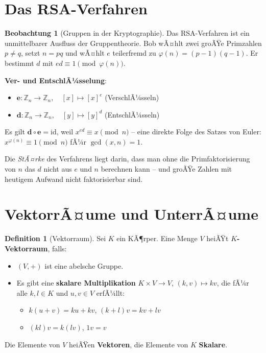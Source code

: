 ﻿\documentclass[a4paper,12pt]{report}
\theoremstyle{definition}
\newtheorem{definition}{Definition}
\newtheorem{beobachtung}{Beobachtung}
\begin{document}
\section{Das RSA-Verfahren}

\begin{beobachtung}[Gruppen in der Kryptographie]
    Das RSA-Verfahren ist ein unmittelbarer Ausfluss der Gruppentheorie.
    Bob wÃ¤hlt zwei groÃŸe Primzahlen $p \neq q$, setzt $n = pq$ und wÃ¤hlt
    $e$ teilerfremd zu $\varphi(n) = (p-1)(q-1)$. Er bestimmt $d$ mit
    $ed \equiv 1 \pmod{\varphi(n)}$.

    \textbf{Ver- und EntschlÃ¼sselung}:
    \begin{itemize}
        \item[-] $\mathbf{e} : \mathbb{Z}_n \to \mathbb{Z}_n, \quad [x] \mapsto [x]^e$ \quad (VerschlÃ¼sseln)
        \item[-] $\mathbf{d} : \mathbb{Z}_n \to \mathbb{Z}_n, \quad [y] \mapsto [y]^d$ \quad (EntschlÃ¼sseln)
    \end{itemize}
    Es gilt $\mathbf{d} \circ \mathbf{e} = \mathrm{id}$, weil $x^{ed} \equiv x \pmod{n}$
    -- eine direkte Folge des Satzes von Euler: $x^{\varphi(n)} \equiv 1 \pmod{n}$
    fÃ¼r $\gcd(x, n) = 1$.

    Die \emph{StÃ¤rke} des Verfahrens liegt darin, dass man ohne die
    Primfaktorisierung von $n$ das $d$ nicht aus $e$ und $n$ berechnen kann --
    und groÃŸe Zahlen mit heutigem Aufwand nicht faktorisierbar sind.
\end{beobachtung}

\section{VektorrÃ¤ume und UnterrÃ¤ume}

\begin{definition}[Vektorraum]
    Sei $K$ ein KÃ¶rper. Eine Menge $V$ heiÃŸt \textbf{$K$-Vektorraum}, falls:
    \begin{itemize}
        \item[-] $(V, +)$ ist eine abelsche Gruppe.
        \item[-] Es gibt eine \textbf{skalare Multiplikation}
              $K \times V \to V$, $(k, v) \mapsto kv$, die fÃ¼r alle $k, l \in K$
              und $u, v \in V$ erfÃ¼llt:
        \begin{itemize}
            \item[-] $k(u + v) = ku + kv$, \quad $(k + l)v = kv + lv$
            \item[-] $(kl)v = k(lv)$, \quad $1v = v$
        \end{itemize}
    \end{itemize}
    Die Elemente von $V$ heiÃŸen \textbf{Vektoren}, die Elemente von $K$
    \textbf{Skalare}.
\end{definition}
\end{document}
